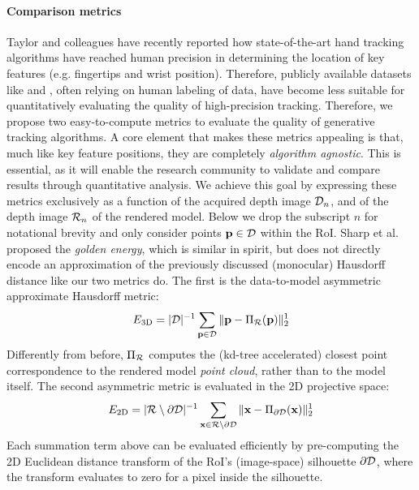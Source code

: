 \paragraph{Comparison metrics}
Taylor and colleagues  have recently reported how state-of-the-art hand tracking algorithms have reached human precision in determining the location of key features (e.g. fingertips and wrist position). Therefore, publicly available datasets like \cite{tompson2014real} and \cite{sridhar2013multicam}, often relying on human labeling of data, have become less suitable for quantitatively evaluating the quality of high-precision tracking. 
% 
Therefore, we propose two easy-to-compute metrics to evaluate the quality of generative tracking algorithms. A core element that makes these metrics appealing is that, much like key feature positions, they are completely \emph{algorithm agnostic}. This is essential, as it will enable the research community to validate and compare results through quantitative analysis. 
% 
We achieve this goal by expressing these metrics exclusively as a function of the acquired depth image $\mathcal{D}_n$, and of the depth image $\mathcal{R}_{n}$ of the rendered model. Below we drop the subscript $n$ for notational brevity and only consider points  $\mathbf{p} \in \mathcal{D}$ within the RoI.  Sharp et al.~ proposed the \emph{golden energy}, which is similar in spirit, but does not directly encode an approximation of the previously discussed (monocular) Hausdorff distance like our two metrics do. The first is the data-to-model asymmetric approximate Hausdorff metric: 
% 
\begin{equation}
E_\text{3D} = |\mathcal{D}|^{-1} \sum_{\mathbf{p} \in \mathcal{D}} \| \mathbf{p} - \Pi_{\mathcal{R}}(\mathbf{p}) \|_2^1
\label{eq:metric1}
\end{equation}
% 
Differently from before, $\Pi_{\mathcal{R}}$ computes the (kd-tree accelerated) closest point correspondence to the rendered model \emph{point cloud}, rather than to the model itself. The second asymmetric metric is evaluated in the 2D projective space:
% 
\begin{eqnarray}
E_\text{2D} = |\mathcal{R} \setminus \partial\mathcal{D}|^{-1} 
\sum_{\mathbf{x} \in \mathcal{R} \setminus \partial\mathcal{D}} \| \mathbf{x} - \Pi_{\partial\mathcal{D}}(\mathbf{x}) \|^1_2
\label{eq:metric2}
\end{eqnarray}
% 
Each summation term above can be evaluated efficiently by pre-computing the 2D Euclidean distance transform of the RoI's (image-space) silhouette $\partial \mathcal{D}$, where the transform evaluates to zero for a pixel inside the silhouette.

